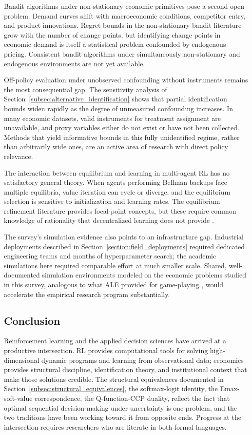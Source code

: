 Bandit algorithms under non-stationary economic primitives pose a second open problem.
Demand curves shift with macroeconomic conditions, competitor entry, and product innovations.
Regret bounds in the non-stationary bandit literature grow with the number of change points, but identifying change points in economic demand is itself a statistical problem confounded by endogenous pricing.
Consistent bandit algorithms under simultaneously non-stationary and endogenous environments are not yet available.

Off-policy evaluation under unobserved confounding without instruments remains the most consequential gap.
The sensitivity analysis of Section~\ref{subsec:alternative_identification} shows that partial identification bounds widen rapidly as the degree of unmeasured confounding increases.
In many economic datasets, valid instruments for treatment assignment are unavailable, and proxy variables either do not exist or have not been collected.
Methods that yield informative bounds in this fully unidentified regime, rather than arbitrarily wide ones, are an active area of research with direct policy relevance.

The interaction between equilibrium and learning in multi-agent RL has no satisfactory general theory.
When agents performing Bellman backups face multiple equilibria, value iteration can cycle or diverge, and the equilibrium selection is sensitive to initialization and learning rates.
The equilibrium refinement literature provides focal-point concepts, but these require common knowledge of rationality that decentralized learning does not provide \citep{FudenbergLevine1998}.

The survey's simulation evidence also points to an infrastructure gap.
Industrial deployments described in Section~\ref{section:field_deployments} required dedicated engineering teams and months of hyperparameter search; the academic simulations here required comparable effort at much smaller scale.
Shared, well-documented simulation environments modeled on the economic problems studied in this survey, analogous to what ALE provided for game-playing \citep{mnih2015}, would accelerate the empirical research program substantially.

\subsection{Conclusion}

Reinforcement learning and the applied decision sciences have arrived at a productive intersection.
RL provides computational tools for solving high-dimensional dynamic programs and learning from observational data; economics provides structural discipline, identification theory, and institutional context that make those solutions credible.
The structural equivalences documented in Section~\ref{subsec:structural_equivalences}, the softmax-logit identity, the Emax-soft-value correspondence, the Q-function-CCP duality, reflect the fact that optimal sequential decision-making under uncertainty is one problem, and the two traditions have been working toward it from opposite ends.
Progress at the intersection requires researchers who are literate in both formal languages.
